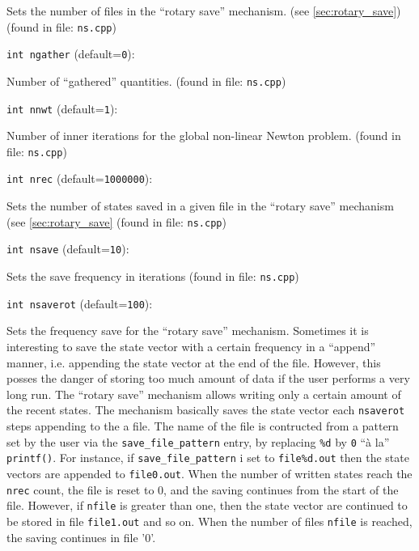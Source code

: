 Sets the number of files in the ``rotary save'' mechanism. 
(see \ref{sec:rotary_save})
 (found in file: \verb+ns.cpp+)
\item\verb+int ngather+ {\rm(default=\verb|0|)}:

Number of ``gathered'' quantities.
 (found in file: \verb+ns.cpp+)
\item\verb+int nnwt+ {\rm(default=\verb|1|)}:

Number of inner iterations for the global non-linear
Newton  problem. 
 (found in file: \verb+ns.cpp+)
\item\verb+int nrec+ {\rm(default=\verb|1000000|)}:

Sets the number of states saved in a given file
in the ``rotary save'' mechanism (see \ref{sec:rotary_save}
 (found in file: \verb+ns.cpp+)
\item\verb+int nsave+ {\rm(default=\verb|10|)}:

Sets the save frequency in iterations 
 (found in file: \verb+ns.cpp+)
\item\verb+int nsaverot+ {\rm(default=\verb|100|)}:

Sets the frequency save for the ``rotary save'' mechanism. 
\label{sec:rotary_save}
Sometimes it is interesting to save the state vector with a certain
frequency in a ``append'' manner, i.e. appending the state vector at
the end of the file. However, this posses the danger of storing too
much amount of data if the user performs a very long run. The ``rotary
save'' mechanism allows writing only a certain amount of the recent
states. The mechanism basically saves the state vector each
\verb+nsaverot+ steps appending to the a file. The name of the file is
contructed from a pattern set by the user via the
\verb+save_file_pattern+ entry, by replacing \verb+%d+ 
by \verb+0+ ``\`a la'' \verb+printf()+. For instance, if
\verb+save_file_pattern+ i set to \verb+file%d.out+ 
then the state vectors are appended to \verb+file0.out+.  When the
number of written states reach the \verb+nrec+ count, the file is
reset to 0, and the saving continues from the start of the
file. However, if \verb+nfile+ is greater than one, then the state
vector are continued to be stored in file \verb+file1.out+ and so
on. When the number of files \verb+nfile+ is reached, the saving
continues in file '0'.

